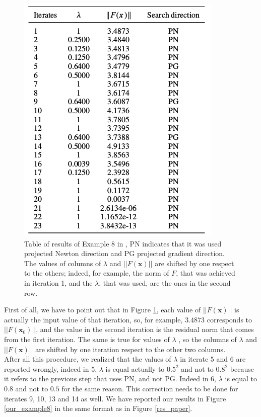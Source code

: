 \begin{figure}[h]
	\centering
	\includegraphics[width=0.6\linewidth]{results_example8}
	\caption[Table of results of example 8 in \cite{MAIN}]{Table of results of Example 8 in \cite{MAIN}, PN indicates that it was used projected Newton direction and PG projected gradient direction. The values of columns of $ \lambda $ and $ ||F(\textbf{x})|| $ are shifted by one respect to the others; indeed, for example, the norm of $ F $, that was achieved in iteration 1, and the $ \lambda $, that was used, are the ones in the second row.}
	\label{results_example8}
\end{figure}
First of all, we have to point out that in Figure \ref{results_example8}, each value of $ ||F(\textbf{x})|| $ is actually the input value of that iteration, so, for example, $ 3.4873 $ corresponds to $ ||F(\textbf{x}_0)|| $, and the value in the second iteration is the residual norm that comes from the first iteration. The same is true for values of $ \lambda $ , so the columns of $ \lambda $ and $ ||F(\textbf{x})|| $ are shifted by one iteration respect to the other two columns.\\
After all this procedure, we realized that the values of $ \lambda $ in iterate 5 and 6 are reported wrongly, indeed in 5, $ \lambda $ is equal actually to $ 0.5^2 $ and not to $ 0.8^2 $ because it refers to the previous step that uses PN, and not PG. Indeed in 6, $ \lambda$ is equal to $0.8 $ and not to $ 0.5 $ for the same reason. This correction needs to be done for iterates 9, 10, 13 and 14 as well. We have reported our results in Figure \ref{our_example8} in the same format as in Figure \ref{res_paper}.\\
